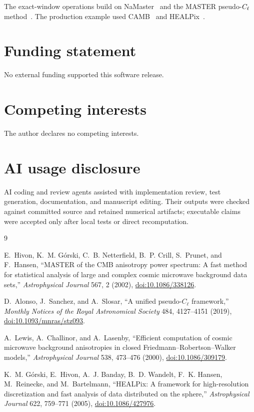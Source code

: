 The exact-window operations build on NaMaster~\cite{Alonso2019} and the MASTER
pseudo-\(C_\ell\) method~\cite{Hivon2002}.  The production example used
CAMB~\cite{Lewis2000} and HEALPix~\cite{Gorski2005}.

\section*{Funding statement}

No external funding supported this software release.

\section*{Competing interests}

The author declares no competing interests.

\section*{AI usage disclosure}

AI coding and review agents assisted with implementation review, test
generation, documentation, and manuscript editing. Their outputs were checked
against committed source and retained numerical artifacts; executable claims
were accepted only after local tests or direct recomputation.

\footnotesize
\begin{thebibliography}{9}

E.~Hivon, K.~M. G\'orski, C.~B. Netterfield, B.~P. Crill, S.~Prunet, and
F.~Hansen, ``MASTER of the CMB anisotropy power spectrum:
A fast method for statistical analysis of large and complex cosmic microwave
background data sets,'' \emph{Astrophysical Journal} 567, 2 (2002),
\href{https://doi.org/10.1086/338126}{doi:10.1086/338126}.

D.~Alonso, J.~Sanchez, and A.~Slosar, ``A unified pseudo-\(C_\ell\) framework,''
\emph{Monthly Notices of the Royal Astronomical Society} 484, 4127--4151
(2019), \href{https://doi.org/10.1093/mnras/stz093}{doi:10.1093/mnras/stz093}.

A.~Lewis, A.~Challinor, and A.~Lasenby, ``Efficient computation of cosmic
microwave background anisotropies in closed Friedmann--Robertson--Walker
models,'' \emph{Astrophysical Journal} 538, 473--476 (2000),
\href{https://doi.org/10.1086/309179}{doi:10.1086/309179}.

K.~M. G\'orski, E.~Hivon, A.~J. Banday, B.~D. Wandelt, F.~K. Hansen,
M.~Reinecke, and M.~Bartelmann, ``HEALPix: A framework for high-resolution
discretization and fast analysis of data distributed on the sphere,''
\emph{Astrophysical Journal} 622, 759--771 (2005),
\href{https://doi.org/10.1086/427976}{doi:10.1086/427976}.

\end{thebibliography}
\normalsize

